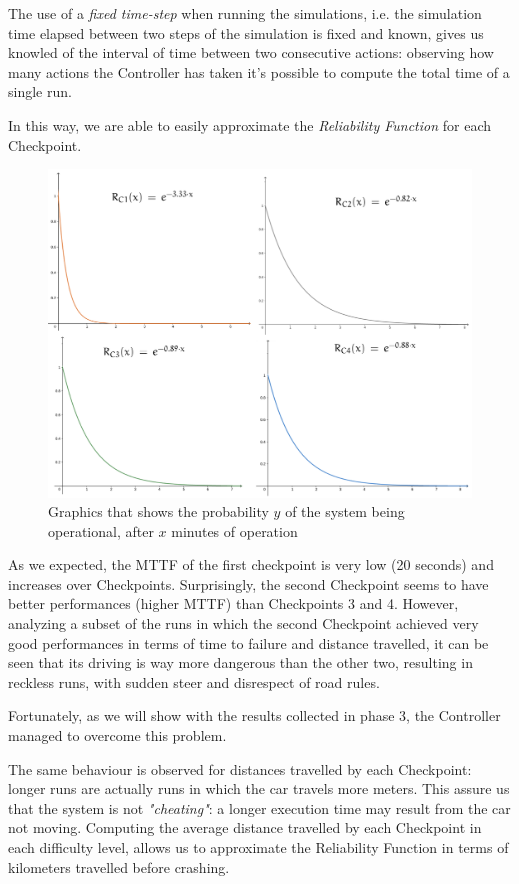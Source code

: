 The use of a \textsl{fixed time-step} when running the simulations, i.e. the simulation time elapsed between two steps of the simulation is fixed and known, gives us knowled of the interval of time between two consecutive actions: observing how many actions the Controller has taken it's possible to compute the total time of a single run.

In this way, we are able to easily approximate the \textsl{Reliability Function} for each Checkpoint.

\begin{figure}[h!]
	\includegraphics[width=\textwidth]{img/reliability-comparison.png}
	\caption{Graphics that shows the probability $y$ of the system being operational, after $x$ minutes of operation}
\end{figure}

As we expected, the MTTF of the first checkpoint is very low (20 seconds) and increases over Checkpoints. Surprisingly, the second Checkpoint seems to have better performances (higher MTTF) than Checkpoints 3 and 4. However, analyzing a subset of the runs in which the second Checkpoint achieved very good performances in terms of time to failure and distance travelled, it can be seen that its driving is way more dangerous than the other two, resulting in reckless runs, with sudden steer and disrespect of road rules.

Fortunately, as we will show with the results collected in phase 3, the Controller managed to overcome this problem.\newline

The same behaviour is observed for distances travelled by each Checkpoint: longer runs are actually runs in which the car travels more meters. This assure us that the system is not \textsl{"cheating"}: a longer execution time may result from the car not moving. Computing the average distance travelled by each Checkpoint in each difficulty level, allows us to approximate the Reliability Function in terms of kilometers travelled before crashing.

